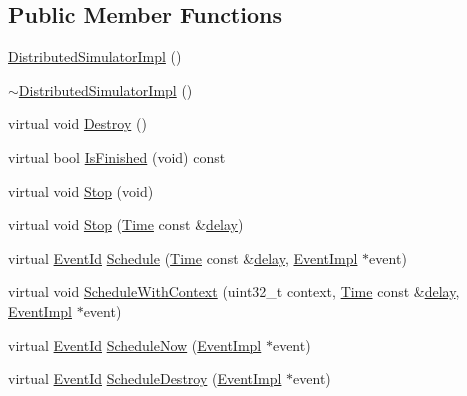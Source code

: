 \subsection*{Public Member Functions}
\begin{DoxyCompactItemize}
\item 
\hyperlink{classns3_1_1DistributedSimulatorImpl_aa3dd6d49e1c354278e075af9ad0bc2cd}{Distributed\+Simulator\+Impl} ()
\item 
\hyperlink{classns3_1_1DistributedSimulatorImpl_a6fa7f1da8f6e0ae2c75d130f1f1f764f}{$\sim$\+Distributed\+Simulator\+Impl} ()
\item 
virtual void \hyperlink{classns3_1_1DistributedSimulatorImpl_a6eaeaca4f82ad8d3b56a94401aa15c8e}{Destroy} ()
\item 
virtual bool \hyperlink{classns3_1_1DistributedSimulatorImpl_a4832655101c40732d4615d78932fb3da}{Is\+Finished} (void) const 
\item 
virtual void \hyperlink{classns3_1_1DistributedSimulatorImpl_af57f3f311e8696c93b2dca475b6eac36}{Stop} (void)
\item 
virtual void \hyperlink{classns3_1_1DistributedSimulatorImpl_ac5c3ff4918441cb0671ecd8d5d54d7df}{Stop} (\hyperlink{classns3_1_1Time}{Time} const \&\hyperlink{mmwave_2model_2fading-traces_2fading__trace__generator_8m_a7964e6aa8f61a9d28973c8267a606ad8}{delay})
\item 
virtual \hyperlink{classns3_1_1EventId}{Event\+Id} \hyperlink{classns3_1_1DistributedSimulatorImpl_a274125ed69833d03e98c2e286daaa5ae}{Schedule} (\hyperlink{classns3_1_1Time}{Time} const \&\hyperlink{mmwave_2model_2fading-traces_2fading__trace__generator_8m_a7964e6aa8f61a9d28973c8267a606ad8}{delay}, \hyperlink{classns3_1_1EventImpl}{Event\+Impl} $\ast$event)
\item 
virtual void \hyperlink{classns3_1_1DistributedSimulatorImpl_a4791d5cfa3ef2ea0e1d347e1253cbced}{Schedule\+With\+Context} (uint32\+\_\+t context, \hyperlink{classns3_1_1Time}{Time} const \&\hyperlink{mmwave_2model_2fading-traces_2fading__trace__generator_8m_a7964e6aa8f61a9d28973c8267a606ad8}{delay}, \hyperlink{classns3_1_1EventImpl}{Event\+Impl} $\ast$event)
\item 
virtual \hyperlink{classns3_1_1EventId}{Event\+Id} \hyperlink{classns3_1_1DistributedSimulatorImpl_abc8ef391cb69609920caa4eaf9788288}{Schedule\+Now} (\hyperlink{classns3_1_1EventImpl}{Event\+Impl} $\ast$event)
\item 
virtual \hyperlink{classns3_1_1EventId}{Event\+Id} \hyperlink{classns3_1_1DistributedSimulatorImpl_ad30415f829c55c48ef2f3e4f5611b671}{Schedule\+Destroy} (\hyperlink{classns3_1_1EventImpl}{Event\+Impl} $\ast$event)

\end{DoxyCompactItemize}
